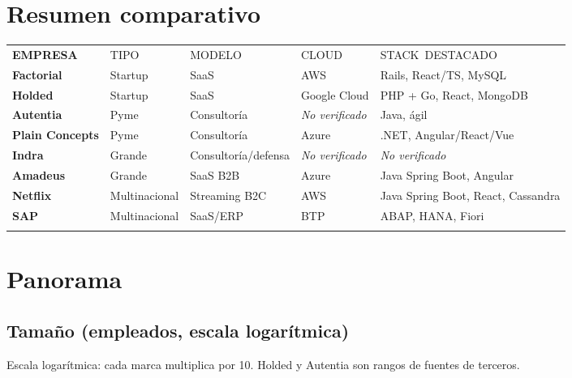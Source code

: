 \documentclass[10.5pt,a4paper]{article}
\newcommand{\cab}[1]{\mbox{\mono\footnotesize\color{inkmuted}#1}}
\newcommand{\mono}{\ttfamily}
\newcommand{\nv}{\textcolor{inkmuted}{\textit{No verificado}}}
\begin{document}
\section{Resumen comparativo}
\begin{center}\small
\begin{tabularx}{\textwidth}{@{}>{\bfseries}l l l l X@{}}
\rowcolor{paper}\cab{EMPRESA} & \cab{TIPO} & \cab{MODELO} & \cab{CLOUD} & \cab{STACK DESTACADO} \\
\arrayrulecolor{inkmuted}\midrule
Factorial & Startup & SaaS & AWS & Rails, React/TS, MySQL \\
Holded & Startup & SaaS & Google Cloud & PHP + Go, React, MongoDB \\
Autentia & Pyme & Consultor\'ia & \nv & Java, \'agil \\
Plain Concepts & Pyme & Consultor\'ia & Azure & .NET, Angular/React/Vue \\
Indra & Grande & Consultor\'ia/defensa & \nv & \nv \\
Amadeus & Grande & SaaS B2B & Azure & Java Spring Boot, Angular \\
Netflix & Multinacional & Streaming B2C & AWS & Java Spring Boot, React, Cassandra \\
SAP & Multinacional & SaaS/ERP & BTP & ABAP, HANA, Fiori \\
\arrayrulecolor{inkmuted}\bottomrule
\end{tabularx}
\end{center}

\section{Panorama}
\subsection*{Tama\~no (empleados, escala logar\'itmica)}
\begin{center}
\end{center}
{\mono\footnotesize\color{inkmuted}Escala logar\'itmica: cada marca multiplica por 10. Holded y Autentia son rangos de fuentes de terceros.}
\end{document}
